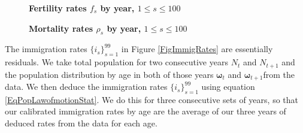 \documentclass[12pt]{report}
\theoremstyle{definition}
\begin{document}
  \begin{figure}[htbp]\centering \captionsetup{width=4.0in}
    \caption{\label{FigFertRates}\textbf{Fertility rates $f_s$ by year, $1\leq s\leq 100$}}
  \end{figure}

  \begin{figure}[htbp]\centering \captionsetup{width=4.0in}
    \caption{\label{FigMortRates}\textbf{Mortality rates $\rho_s$ by year, $1\leq s\leq 100$}}
  \end{figure}

  The immigration rates $\{i_s\}_{s=1}^{99}$ in Figure \ref{FigImmigRates} are essentially residuals. We take total population for two consecutive years $N_t$ and $N_{t+1}$ and the population distribution by age in both of those years $\bm{\omega}_{t}$ and $\bm{\omega}_{t+1}$from the \citet{Census:2014} data. We then deduce the immigration rates $\{i_s\}_{s=1}^{99}$ using equation \eqref{EqPopLawofmotionStat}. We do this for three consecutive sets of years, so that our calibrated immigration rates by age are the average of our three years of deduced rates from the data for each age.
\end{document}
